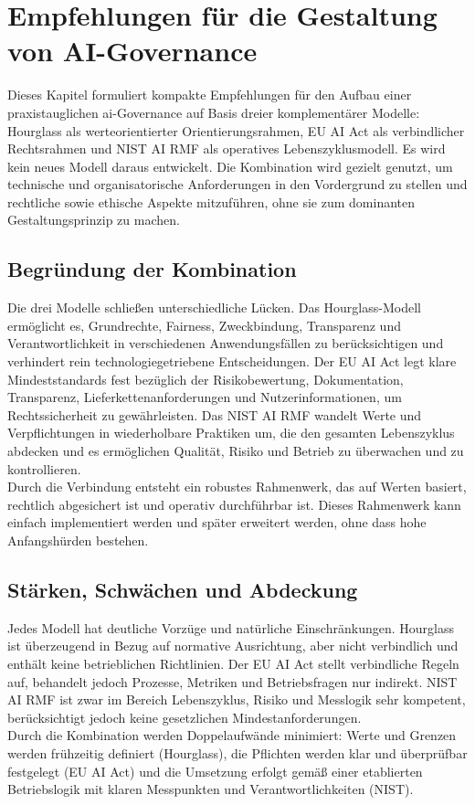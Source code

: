 \section{Empfehlungen für die Gestaltung von AI-Governance}
\label{sec:empfehlungen}

Dieses Kapitel formuliert kompakte Empfehlungen für den Aufbau einer praxistauglichen \ac{ai}-Governance auf Basis dreier komplementärer Modelle: Hourglass als werteorientierter Orientierungsrahmen, EU AI Act als verbindlicher Rechtsrahmen und NIST AI RMF als operatives Lebenszyklusmodell.
Es wird kein neues Modell daraus entwickelt.
Die Kombination wird gezielt genutzt, um technische und organisatorische Anforderungen in den Vordergrund zu stellen und rechtliche sowie ethische Aspekte mitzuführen, ohne sie zum dominanten Gestaltungsprinzip zu machen.

\subsection{Begründung der Kombination}
Die drei Modelle schließen unterschiedliche Lücken.
Das Hourglass-Modell ermöglicht es, Grundrechte, Fairness, Zweckbindung, Transparenz und Verantwortlichkeit in verschiedenen Anwendungsfällen zu berücksichtigen und verhindert rein technologiegetriebene Entscheidungen.
Der EU AI Act legt klare Mindeststandards fest bezüglich der Risikobewertung, Dokumentation, Transparenz, Lieferkettenanforderungen und Nutzerinformationen, um Rechtssicherheit zu gewährleisten.
Das NIST AI RMF wandelt Werte und Verpflichtungen in wiederholbare Praktiken um, die den gesamten Lebenszyklus abdecken und es ermöglichen Qualität, Risiko und Betrieb zu überwachen und zu kontrollieren.
\\
Durch die Verbindung entsteht ein robustes Rahmenwerk, das auf Werten basiert, rechtlich abgesichert ist und operativ durchführbar ist.
Dieses Rahmenwerk kann einfach implementiert werden und später erweitert werden, ohne dass hohe Anfangshürden bestehen.

\subsection{Stärken, Schwächen und Abdeckung}
Jedes Modell hat deutliche Vorzüge und natürliche Einschränkungen.
Hourglass ist überzeugend in Bezug auf normative Ausrichtung, aber nicht verbindlich und enthält keine betrieblichen Richtlinien.
Der EU AI Act stellt verbindliche Regeln auf, behandelt jedoch Prozesse, Metriken und Betriebsfragen nur indirekt.
NIST AI RMF ist zwar im Bereich Lebenszyklus, Risiko und Messlogik sehr kompetent, berücksichtigt jedoch keine gesetzlichen Mindestanforderungen.
\\
Durch die Kombination werden Doppelaufwände minimiert:
Werte und Grenzen werden frühzeitig definiert (Hourglass), die Pflichten werden klar und überprüfbar festgelegt (EU AI Act) und die Umsetzung erfolgt gemäß einer etablierten Betriebslogik mit klaren Messpunkten und Verantwortlichkeiten (NIST).


